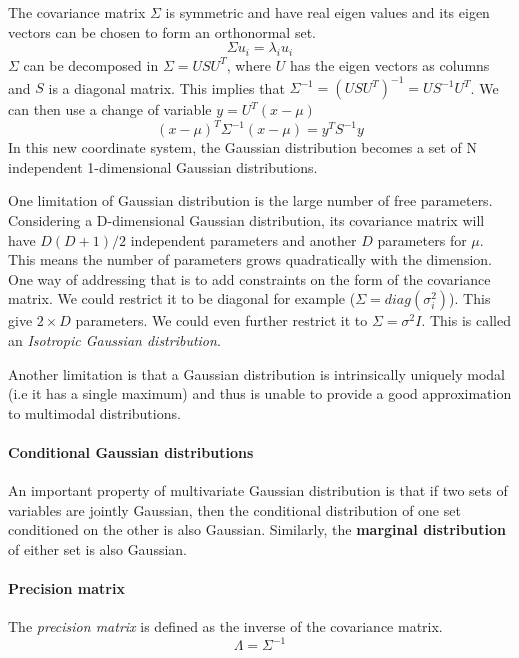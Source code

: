 The covariance matrix $\Sigma$ is symmetric and have real eigen values and its eigen vectors can be chosen to form an orthonormal set.
\begin{equation}
    \Sigma u_i = \lambda_i u_i
\end{equation}
$\Sigma$ can be decomposed in $\Sigma = U S U^T$, where $U$ has the eigen vectors as columns and $S$ is a diagonal matrix. This implies that $\Sigma^{-1} = (USU^T)^{-1} = U S^{-1} U^T$. We can then use a change of variable $y = U^T(x-\mu)$
\begin{equation}
    (x-\mu)^T \Sigma^{-1} (x-\mu) = y^T S^{-1} y
\end{equation}
In this new coordinate system, the Gaussian distribution becomes a set of N independent 1-dimensional Gaussian distributions. 

One limitation of Gaussian distribution is the large number of free parameters. Considering a D-dimensional Gaussian distribution, its covariance matrix will have $D(D+1)/2$ independent parameters and another $D$ parameters for $\mu$. This means the number of parameters grows quadratically with the dimension.
One way of addressing that is to add constraints on the form of the covariance matrix. We could restrict it to be diagonal for example ($\Sigma=diag(\sigma_i^2)$). This give $2\times D$ parameters. We could even further restrict it to $\Sigma = \sigma^2 I$. This is called an \textit{Isotropic Gaussian distribution}.

Another limitation is that a Gaussian distribution is intrinsically uniquely modal (i.e it has a single maximum) and thus is unable to provide a good approximation to multimodal distributions.

\paragraph{Conditional Gaussian distributions}
An important property of multivariate Gaussian distribution is that if two sets of variables are jointly Gaussian, then the conditional distribution of one set conditioned on the other is also Gaussian. Similarly, the \textbf{marginal distribution} of either set is also Gaussian.

\paragraph{Precision matrix}
The \textit{precision matrix} is defined as the inverse of the covariance matrix.
\begin{equation}
    \Lambda = \Sigma^{-1}
\end{equation}

